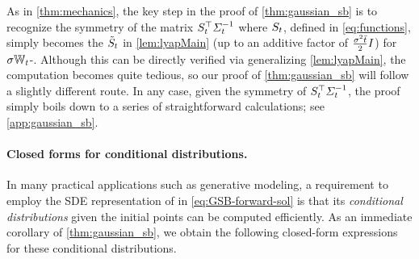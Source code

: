 As in \cref{thm:mechanics}, the key step in the proof of \cref{thm:gaussian_sb} is to recognize the symmetry of the matrix $S_{t}^\top \Sigma^{-1}_{ t }$ where $S_{t}$, defined in \eqref{eq:functions}, simply becomes the $\tilde{S}_{t}$ in \cref{lem:lyapMain} (up to an additive factor of $\frac{\sigma^2\bar{t}}{2}I$) for $\sigma\mathbb{W}_{t}$-. Although this can be directly verified via generalizing \cref{lem:lyapMain}, the computation becomes quite tedious, so our proof of \cref{thm:gaussian_sb} will follow a slightly different route. In any case, given the symmetry of $S_{t}^\top \Sigma^{-1}_{ t }$, the proof simply boils down to a series of straightforward calculations; see \cref{app:gaussian_sb}.

\paragraph{Closed forms for conditional distributions.}
In many practical applications such as generative modeling, a requirement to employ the \acrshort{SDE} representation of  in \eqref{eq:GSB-forward-sol} is that its \emph{conditional distributions} given the initial points can be computed efficiently. As an immediate corollary of \cref{thm:gaussian_sb}, we obtain the following closed-form expressions for these conditional distributions. %
